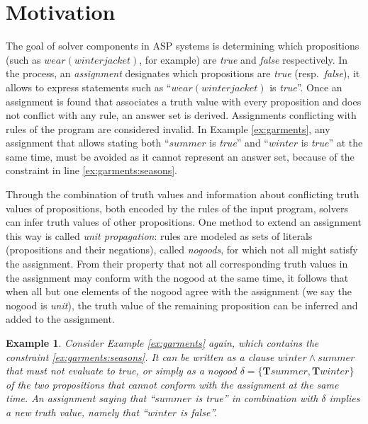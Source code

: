 \documentclass{vutinfth} %
\newtheorem{example}{Example}[chapter]
\newcommand{\bT}{\mathbf{T}}
\begin{document}
\section{Motivation}
\label{sec:motivation}

The goal of solver components in ASP systems is determining which propositions (such as $wear(winterjacket)$, for example) are \emph{true} and \emph{false} respectively. In the process, an \emph{assignment} designates which propositions are \emph{true} (resp.~\emph{false}), it allows to express statements such as \enquote{$wear(winterjacket)$ is \emph{true}}. Once an assignment is found that associates a truth value with every proposition and does not conflict with any rule, an answer set is derived. Assignments conflicting with rules of the program are considered invalid. In Example \ref{ex:garments}, any assignment that allows stating both \enquote{$summer$ is \emph{true}} and \enquote{$winter$ is \emph{true}} at the same time, must be avoided as it cannot represent an answer set, because of the constraint in line \ref{ex:garments:seasons}.

Through the combination of truth values and information about conflicting truth values of propositions, both encoded by the rules of the input program, solvers can infer truth values of other propositions. One method to extend an assignment this way is called \emph{unit propagation}: rules are modeled as sets of literals (propositions and their negations), called \emph{nogoods}, for which not all might satisfy the assignment. From their property that not all corresponding truth values in the assignment may conform with the nogood at the same time, it follows that when all but one elements of the nogood agree with the assignment (we say the nogood is \emph{unit}), the truth value of the remaining proposition can be inferred and added to the assignment.

\begin{example}
\label{ex:garmentprop}
Consider Example \ref{ex:garments} again, which contains the constraint \ref{ex:garments:seasons}. It can be written as a clause $winter \wedge summer$ that must not evaluate to \emph{true}, or simply as a nogood $\delta = \{ \bT summer, \bT winter \}$ of the two propositions that cannot conform with the assignment at the same time. An assignment saying that \enquote{$summer$ is \emph{true}} in combination with $\delta$ implies a new truth value, namely that \enquote{$winter$ is \emph{false}}.
\end{example}
\end{document}
